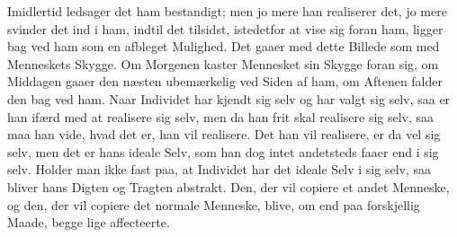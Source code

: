 \documentclass[12pt,a4paper]{article}
\begin{document}
Imidlertid ledsager det ham bestandigt; men jo mere han realiserer det, jo mere svinder det ind i ham, indtil det tilsidst, istedetfor at vise sig foran ham, ligger bag ved ham som en afbleget Mulighed. Det gaaer med dette Billede som med Menneskets Skygge. Om Morgenen kaster Mennesket sin Skygge foran sig, om Middagen gaaer den næsten ubemærkelig ved Siden af ham, om Aftenen falder den bag ved ham. Naar Individet har kjendt sig selv og har valgt sig selv, saa er han ifærd med at realisere sig selv, men da han frit skal realisere sig selv, saa maa han vide, hvad det er, han vil realisere. Det han vil realisere, er da vel sig selv, men det er hans ideale Selv, som han dog intet andetsteds faaer end i sig selv. Holder man ikke fast paa, at Individet har det ideale Selv i sig selv, saa bliver hans Digten og Tragten abstrakt. Den, der vil copiere et andet Menneske, og den, der vil copiere det normale Menneske, blive, om end paa forskjellig Maade, begge lige affecteerte.
\end{document}
